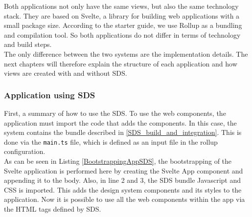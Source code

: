 Both applications not only have the same views, but also the same technology stack. They are based on Svelte, a library for building web applications with a small package size. According to the starter guide, we use Rollup as a bundling and compilation tool. So both applications do not differ in terms of technology and build steps. \cite{svelte_svelte_nodate} \\
The only difference between the two systems are the implementation details. The next chapters will therefore explain the structure of each application and how views are created with and without SDS.
\subsubsection{Application using \ac{SDS}}
First, a summary of how to use the \acl{SDS}. To use the web components, the application must import the code that adds the components. In this case, the system contains the bundle described in \ref{SDS_build_and_integration}. This is done via the \texttt{main.ts} file, which is defined as an input file in the rollup configuration. \\

As can be seen in Listing \ref{BootstrappingAppSDS}, the bootstrapping of the Svelte application is performed here by creating the Svelte App component and appending it to the body. Also, in line 2 and 3, the SDS bundle Javascript and CSS is imported. This adds the design system components and its styles to the application. Now it is possible to use all the web components within the app via the HTML tags defined by \ac{SDS}. \\

